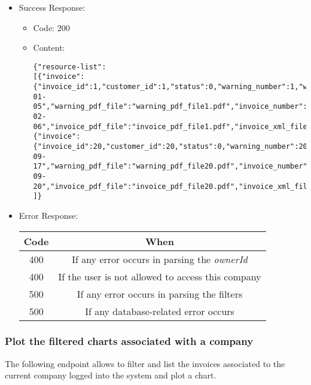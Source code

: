 \begin{itemize}
    \item Success Response: 
    \begin{itemize}
        \item Code: 200
        \item Content:
        \begin{lstlisting}
{"resource-list":
[{"invoice":{"invoice_id":1,"customer_id":1,"status":0,"warning_number":1,"warning_date":"2022-01-05","warning_pdf_file":"warning_pdf_file1.pdf","invoice_number":"1","invoice_date":"2022-02-06","invoice_pdf_file":"invoice_pdf_file1.pdf","invoice_xml_file":"invoice_xml_file1.xml","total":168.3,"discount":15.0,"pension_fund_refund":4.1,"has_stamp":false}},
{"invoice":{"invoice_id":20,"customer_id":20,"status":0,"warning_number":20,"warning_date":"2022-09-17","warning_pdf_file":"warning_pdf_file20.pdf","invoice_number":"20","invoice_date":"2022-09-20","invoice_pdf_file":"invoice_pdf_file20.pdf","invoice_xml_file":"invoice_xml_file20.xml","total":71.2,"discount":46.8,"pension_fund_refund":3.2,"has_stamp":false}}
]}
        \end{lstlisting}    
    \end{itemize}
    
    \item Error Response:
    \begin{table}[!h]
    \centering 
    \begin{tabular}{|c|c|}
    \hline
    \multicolumn{1}{|c|}{\textbf{Code}} & \multicolumn{1}{c|}{\textbf{When}} \\ \hline
    400 & If any error occurs in parsing the \textit{ownerId}  \\\hline
    400 & If the user is not allowed to access this company \\\hline
    500 & If any error occurs in parsing the filters \\\hline
    500 & If any database-related error occurs \\\hline
    \end{tabular} 
    \end{table} 
    
\end{itemize}


\newpage
\subsubsection*{Plot the filtered charts associated with a company}

The following endpoint allows to filter and list the invoices associated to the current company logged into the system and plot a chart.

